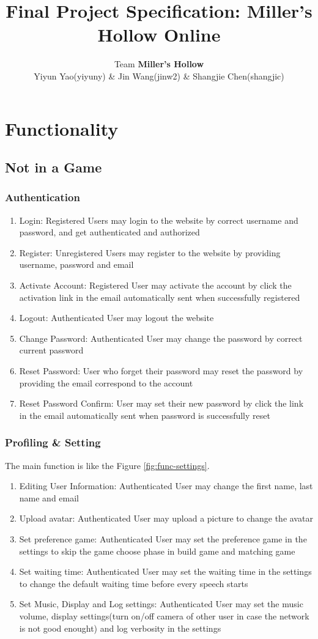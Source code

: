 \documentclass[11pt]{article}
\title{Final Project Specification: Miller's Hollow Online}
\author{Team \textbf{Miller's Hollow}
\\Yiyun Yao(yiyuny) \& Jin Wang(jinw2) \& Shangjie Chen(shangjic)}
\date{}                                           %
\begin{document}
\maketitle

\section{Functionality}
\subsection{Not in a Game}
\subsubsection{Authentication}
\begin{enumerate}
\item
Login: Registered Users may login to the website by correct username and password, and get authenticated and authorized
\item
Register: Unregistered Users may register to the website by providing username, password and email
\item
Activate Account: Registered User may activate the account by click the activation link in the email automatically sent when successfully registered
\item
Logout: Authenticated User may logout the website
\item
Change Password: Authenticated User may change the password by correct current password
\item
Reset Password: User who forget their password may reset the password by providing the email correspond to the account
\item
Reset Password Confirm: User may set their new password by click the link in the email automatically sent when password is successfully reset
\end{enumerate}

\subsubsection{Profiling \& Setting}
The main function is like the Figure \ref{fig:func-settings}.

\begin{enumerate}
\item
Editing User Information: Authenticated User may change the first name, last name and email
\item
Upload avatar: Authenticated User may upload a picture to change the avatar
\item
Set preference game: Authenticated User may set the preference game in the settings to skip the game choose phase in build game and matching game
\item
Set waiting time: Authenticated User may set the waiting time in the settings to change the default waiting time before every speech starts
\item
Set Music, Display and Log settings: Authenticated User may set the music volume, display settings(turn on/off camera of other user in case the network is not good enought) and log verbosity in the settings
\end{enumerate}
\end{document}
